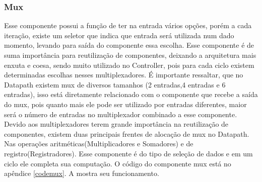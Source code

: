 \subsubsection{Mux}
Esse componente possui a função de ter na entrada vários opções, porém a cada iteração, existe um seletor que indica que entrada será utilizada num dado momento, levando para saída do componente essa escolha. Esse componente é de suma importância para reutilização de componentes, deixando a arquitetura mais enxuta e coesa, sendo muito utilizado no Controller, pois para cada ciclo existem determinadas escolhas nesses multiplexadores. É importante ressaltar, que no Datapath existem mux de diversos tamanhos (2 entradas,4 entradas e 6 entradas), isso está diretamente relacionado com o componente que recebe a saída do mux, pois quanto mais ele pode ser utilizado por entradas diferentes, maior será o número de entradas no multiplexador combinado a esse componente. Devido aos multiplexadores terem grande importância na reutilização de componentes, existem duas principais frentes de alocação de mux no Datapath. Nas operações aritméticas(Multiplicadores e Somadores) e de registro(Registradores). Esse componente é do tipo de seleção de dados e em um ciclo ele completa sua computação. O código do componente mux está no apêndice \ref{codemux}.	A  mostra seu funcionamento.

